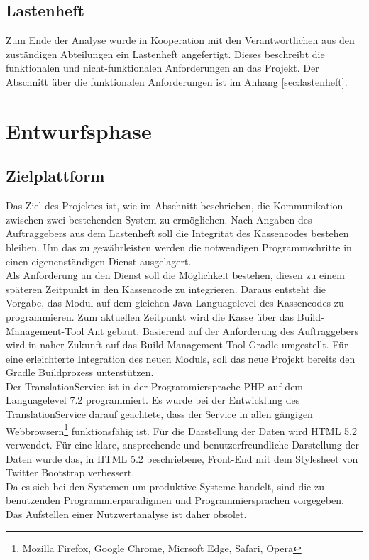 \documentclass[10pt, oneside, ngerman]{article}
\newcommand{\secref}[1]{\hyperref[{#1}]{\nameref{#1}}}
\begin{document}
  \subsection{Lastenheft}
    Zum Ende der Analyse wurde in Kooperation mit den Verantwortlichen aus den zuständigen Abteilungen ein Lastenheft angefertigt. Dieses beschreibt
    die funktionalen und nicht-funktionalen Anforderungen an das Projekt. Der Abschnitt über die funktionalen Anforderungen ist im Anhang \ref{sec:lastenheft}.
  \section{Entwurfsphase}
    \subsection{Zielplattform}\label{sec:dr:target}
      Das Ziel des Projektes ist, wie im Abschnitt \secref{sec:projectdesc} beschrieben, die Kommunikation zwischen zwei bestehenden System zu ermöglichen.
      Nach Angaben des Auftraggebers aus dem Lastenheft soll die Integrität des Kassencodes bestehen bleiben. Um das zu gewährleisten werden die notwendigen Programmschritte in einen 
      eigenenständigen Dienst ausgelagert.\\
      Als Anforderung an den Dienst soll die Möglichkeit bestehen, diesen zu einem späteren Zeitpunkt in den Kassencode zu integrieren. Daraus entsteht die
      Vorgabe, das Modul auf dem gleichen Java Languagelevel des Kassencodes zu programmieren. %
      Zum aktuellen Zeitpunkt wird die Kasse über das Build-Management-Tool Ant gebaut. Basierend auf der Anforderung des Auftraggebers %
      wird in naher Zukunft auf das Build-Management-Tool Gradle umgestellt. Für eine erleichterte Integration des neuen Moduls, soll das neue Projekt bereits den Gradle 
      Buildprozess unterstützen.\\
      Der TranslationService ist in der Programmiersprache PHP auf dem Languagelevel 7.2 programmiert. Es wurde bei der Entwicklung des TranslationService darauf geachtete,
      dass der Service in allen gängigen Webbrowsern\footnote{Mozilla Firefox, Google Chrome, Micrsoft Edge, Safari, Opera} funktionsfähig ist. Für die Darstellung der Daten wird HTML 5.2 verwendet. 
      Für eine klare, ansprechende und benutzerfreundliche Darstellung der Daten wurde das, in HTML 5.2 beschriebene, Front-End mit dem Stylesheet von Twitter Bootstrap verbessert.\\%
      Da es sich bei den Systemen um produktive Systeme handelt, sind die zu benutzenden Programmierparadigmen und Programmiersprachen vorgegeben.
      Das Aufstellen einer Nutzwertanalyse ist daher obsolet.
\end{document}
